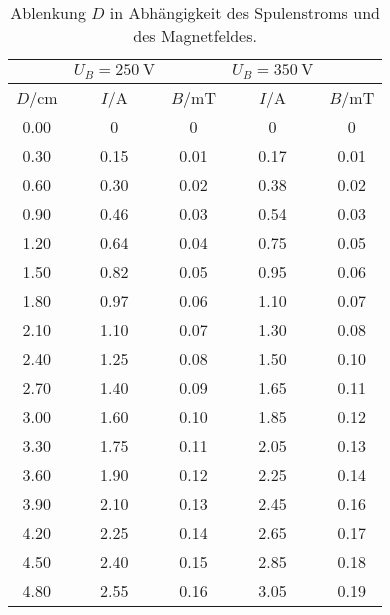 \begin{table}[H]
  \centering
   \begin{tabular}{c| c c| c c}
    \toprule
    \:\:\:\:\:&  $U_B=\SI{250}{\V}$ & & $U_B=\SI{350}{\V}$& \\
    \toprule
    $D$/\;cm & $I$/\;A & $B$/\;mT & $I$/\;A & $B$/\;mT\\
    \midrule
    0.00 & 0    & 0    &  0   & 0\\
    0.30 & 0.15 & 0.01 & 0.17 & 0.01\\
    0.60 & 0.30 & 0.02 & 0.38 & 0.02\\
    0.90 & 0.46 & 0.03 & 0.54 & 0.03\\
    1.20 & 0.64 & 0.04 & 0.75 & 0.05\\
    1.50 & 0.82 & 0.05 & 0.95 & 0.06\\
    1.80 & 0.97 & 0.06 & 1.10 & 0.07\\
    2.10 & 1.10 & 0.07 & 1.30 & 0.08\\
    2.40 & 1.25 & 0.08 & 1.50 & 0.10\\
    2.70 & 1.40 & 0.09 & 1.65 & 0.11\\
    3.00 & 1.60 & 0.10 & 1.85 & 0.12\\
    3.30 & 1.75 & 0.11 & 2.05 & 0.13\\
    3.60 & 1.90 & 0.12 & 2.25 & 0.14\\
    3.90 & 2.10 & 0.13 & 2.45 & 0.16\\
    4.20 & 2.25 & 0.14 & 2.65 & 0.17\\
    4.50 & 2.40 & 0.15 & 2.85 & 0.18\\
    4.80 & 2.55 & 0.16 & 3.05 & 0.19\\
    \bottomrule
  \end{tabular}
  \caption{Ablenkung $D$ in Abhängigkeit des Spulenstroms und des Magnetfeldes.}
  \label{tab:tab2}
\end{table}
